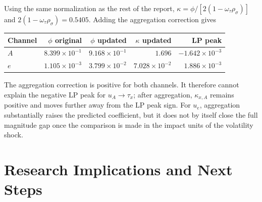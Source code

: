 \documentclass[11pt]{article}
\theoremstyle{plain}
\theoremstyle{definition}
\begin{document}
Using the same normalization as the rest of the report,
$\kappa=\phi/[2(1-\omega_\tau\rho_\sigma)]$ and
$2(1-\omega_\tau\rho_\sigma)=0.5405$. Adding the aggregation correction gives
\begin{center}
\begin{tabular}{lrrrr}
\toprule
Channel & $\phi$ original & $\phi$ updated & $\kappa$ updated & LP peak \\
\midrule
$A$ & $8.399\times10^{-1}$ & $9.168\times10^{-1}$ &
$1.696$ & $-1.642\times10^{-3}$ \\
$e$ & $1.105\times10^{-3}$ & $3.799\times10^{-2}$ &
$7.028\times10^{-2}$ & $1.886\times10^{-3}$ \\
\bottomrule
\end{tabular}
\end{center}

The aggregation correction is positive for both channels. It therefore cannot
explain the negative LP peak for $u_A\to\tau_x$; after aggregation,
$\kappa_{x,A}$ remains positive and moves further away from the LP peak sign.
For $u_e$, aggregation substantially raises the predicted coefficient, but it
does not by itself close the full magnitude gap once the comparison is made in
the impact units of the volatility shock.

\section{Research Implications and Next Steps}
\end{document}

